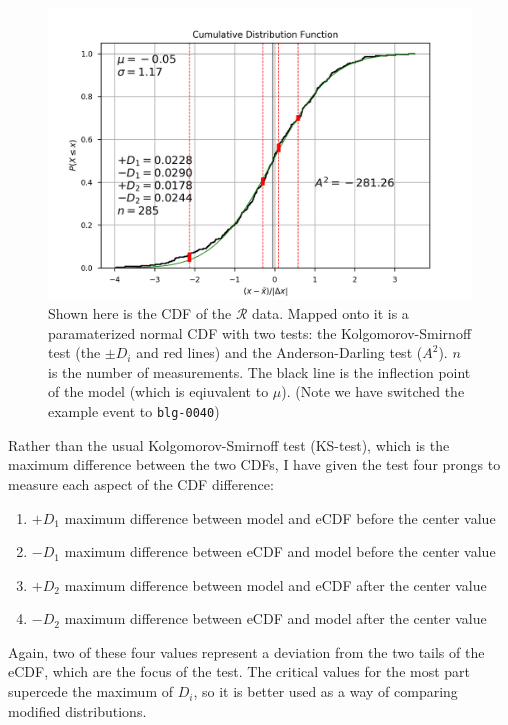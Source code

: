 \documentclass[12pt, a4paper]{article}
\begin{document}
\begin{figure}[H]
\includegraphics[width=\textwidth]{cumu_dist}
\centering
\caption{Shown here is the CDF of the $\mathcal{R}$ data.
  Mapped onto it is a paramaterized normal CDF with two tests: the Kolgomorov-Smirnoff test (the $\pm D_i$ and red lines) and the Anderson-Darling test ($A^2$).
  $n$ is the number of measurements.
  The black line is the inflection point of the model (which is eqiuvalent to $\mu$).
  (Note we have switched the example event to \texttt{blg-0040})
}
\label{fig:cumu_dist}
\end{figure}

Rather than the usual Kolgomorov-Smirnoff test (KS-test),
which is the maximum difference between the two CDFs,
I have given the test four prongs to measure each aspect of the CDF difference:
\begin{enumerate}
\item $+D_1$ maximum difference between model and eCDF before the center value 
\item $-D_1$ maximum difference between eCDF and model before the center value 
\item $+D_2$ maximum difference between model and eCDF after the center value 
\item $-D_2$ maximum difference between eCDF and model after the center value 
\end{enumerate}

Again, two of these four values represent a deviation from the two tails of the eCDF, which are the focus of the test.
The critical values for the most part supercede the maximum of $D_i$, so it is better used as a way of comparing modified distributions.
\end{document}

